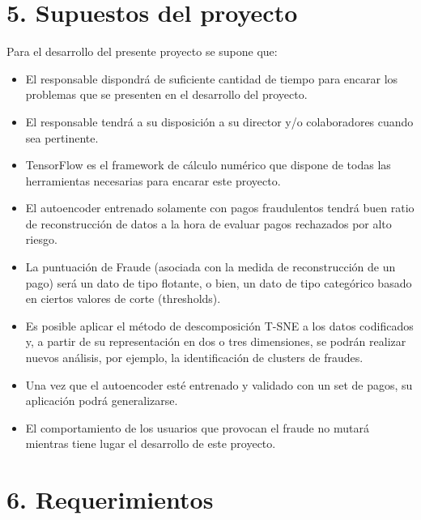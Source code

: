 \documentclass[
11pt, %
]{charter}
\begin{document}
\section{5. Supuestos del proyecto}
\label{sec:supuestos}
Para el desarrollo del presente proyecto se supone que:
\begin{itemize}
	\item El responsable dispondrá de suficiente cantidad de tiempo para encarar los problemas que se presenten en el desarrollo del proyecto.
	\item El responsable tendrá a su disposición a su director y/o colaboradores cuando sea pertinente.
	\item TensorFlow es el framework de cálculo numérico que dispone de todas las herramientas necesarias para encarar este proyecto.
	\item El autoencoder entrenado solamente con pagos fraudulentos tendrá buen ratio de reconstrucción de datos a la hora de evaluar pagos rechazados por alto riesgo.
	\item La puntuación de Fraude (asociada con la medida de reconstrucción de un pago) será un dato de tipo flotante, o bien, un dato de tipo categórico basado en ciertos valores de corte (thresholds). 
	\item Es posible aplicar el método de descomposición T-SNE a los datos codificados y, a partir de su representación en dos o tres dimensiones, se podrán realizar nuevos análisis, por ejemplo, la identificación de clusters de fraudes.
	\item Una vez que el autoencoder esté entrenado y validado con un set de pagos, su aplicación podrá generalizarse.
	\item El comportamiento de los usuarios que provocan el fraude no mutará mientras tiene lugar el desarrollo de este proyecto.
\end{itemize}

\section{6. Requerimientos}
\label{sec:requerimientos}
\end{document}
